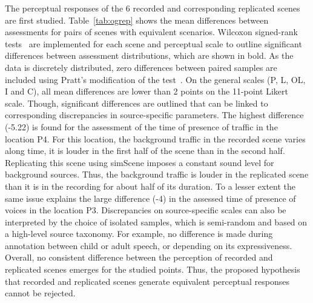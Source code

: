 \documentclass[twocolumn]{article}
\begin{document}
The perceptual responses of the 6 recorded and corresponding replicated scenes are first studied. Table~\ref{tab:ogrep} shows the mean differences between assessments for pairs of scenes with equivalent scenarios. Wilcoxon signed-rank tests~\cite{wilcoxon1945} are implemented for each scene and perceptual scale to outline significant differences between assessment distributions, which are shown in bold. As the data is discretely distributed, zero differences between paired samples are included using Pratt's modification of the test~\cite{pratt1959}. On the general scales (P, L, OL, I and C), all mean differences are lower than 2 points on the 11-point Likert scale. Though, significant differences are outlined that can be linked to corresponding discrepancies in source-specific parameters. The highest difference (-5.22) is found for the assessment of the time of presence of traffic in the location P4. For this location, the background traffic in the recorded scene varies along time, it is louder in the first half of the scene than in the second half. Replicating this scene using simScene imposes a constant sound level for background sources. Thus, the background traffic is louder in the replicated scene than it is in the recording for about half of its duration. To a lesser extent the same issue explains the large difference (-4) in the assessed time of presence of voices in the location P3. Discrepancies on source-specific scales can also be interpreted by the choice of isolated samples, which is semi-random and based on a high-level source taxonomy. For example, no difference is made during annotation between child or adult speech, or depending on its expressiveness. Overall, no consistent difference between the perception of recorded and replicated scenes emerges for the studied points. Thus, the proposed hypothesis that recorded and replicated scenes generate equivalent perceptual responses cannot be rejected.
\end{document}
